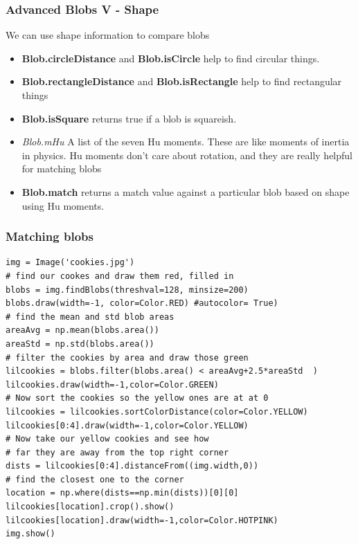 \documentclass{beamer}
\begin{document}
\begin{frame}
  \frametitle{Advanced Blobs V - Shape}
We can use shape information to compare blobs
\begin{itemize}
\item \textbf{Blob.circleDistance} and \textbf{Blob.isCircle} help to
  find circular things.
\item \textbf{Blob.rectangleDistance} and \textbf{Blob.isRectangle} help to
  find rectangular things
\item \textbf{Blob.isSquare} returns true if a blob is squareish. 
\item \textit{Blob.mHu} A list of the seven Hu moments. These are like
  moments of inertia in physics. Hu moments don't care about
  rotation, and they are really helpful for matching blobs
\item \textbf{Blob.match} returns a match value against a particular
  blob based on shape using Hu moments.
\end{itemize}
\end{frame}
\begin{frame}[fragile] 
\frametitle{Matching blobs}
\begin{example}
\begin{verbatim}
img = Image('cookies.jpg')
# find our cookes and draw them red, filled in
blobs = img.findBlobs(threshval=128, minsize=200)
blobs.draw(width=-1, color=Color.RED) #autocolor= True)
# find the mean and std blob areas
areaAvg = np.mean(blobs.area())
areaStd = np.std(blobs.area())
# filter the cookies by area and draw those green
lilcookies = blobs.filter(blobs.area() < areaAvg+2.5*areaStd  )
lilcookies.draw(width=-1,color=Color.GREEN)
# Now sort the cookies so the yellow ones are at at 0
lilcookies = lilcookies.sortColorDistance(color=Color.YELLOW)
lilcookies[0:4].draw(width=-1,color=Color.YELLOW)
# Now take our yellow cookies and see how
# far they are away from the top right corner
dists = lilcookies[0:4].distanceFrom((img.width,0))
# find the closest one to the corner
location = np.where(dists==np.min(dists))[0][0]
lilcookies[location].crop().show()
lilcookies[location].draw(width=-1,color=Color.HOTPINK)
img.show()
\end{verbatim}
\end{example}
\end{frame} 
\end{document}
